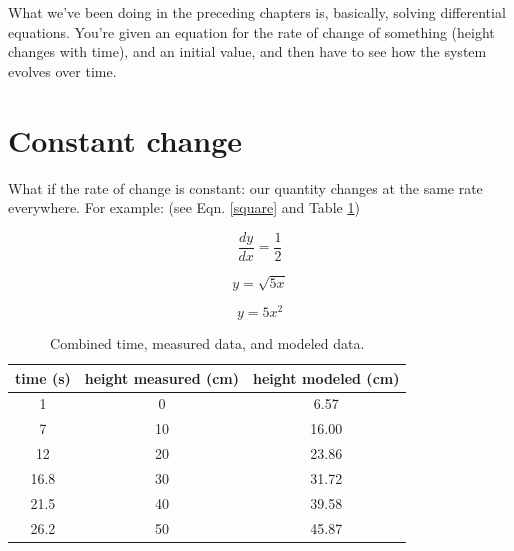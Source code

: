 \documentclass[11pt,fleqn]{book}
\begin{document}
	What we've been doing in the preceding chapters is, basically, solving differential equations. You're given an equation for the rate of change of something (height changes with time), and an initial value, and then have to see how the system evolves over time. 
	
	\section{Constant change}
	
	What if the rate of change is constant: our quantity changes at the same rate everywhere. For example: (see Eqn. \ref{square} and Table \ref{table:filling_data})
	
	\begin{equation}
		\frac{dy}{dx} = \frac{1}{2}
	\end{equation}

	\begin{equation}
		\label{test}
		y = \sqrt{5x}
	\end{equation}

	\begin{equation}
	\label{square}
	y = 5x^2
	\end{equation}

	\begin{table}[h!]
		\label{table:filling_data}
		\centering
		\begin{tabular}{||c | c | c||} 
			\hline
			time (s) & height measured (cm) & height modeled (cm)\\ [0.5ex] 
			\hline\hline
			1	& 0 & 6.57 \\
			7	& 10 & 16.00 \\
			12	& 20 & 23.86 \\
			16.8	& 30 & 31.72 \\
			21.5	& 40 & 39.58 \\
			26.2	& 50 & 45.87 \\ [1ex] 
			\hline
		\end{tabular}
		\caption{Combined time, measured data, and modeled data.}
	\end{table}

	

 
\end{document}
